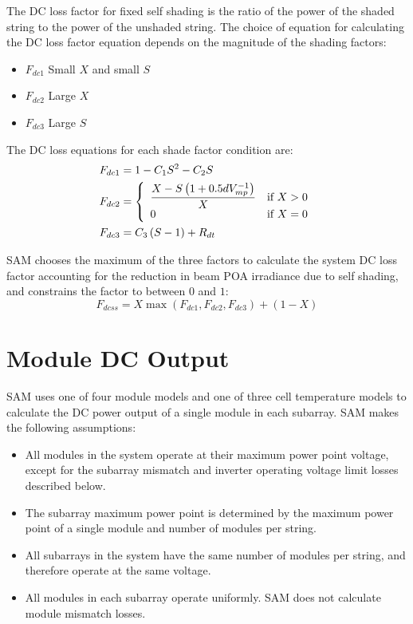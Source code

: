 \documentclass[12pt,letterpaper]{article}
\begin{document}
The DC loss factor for fixed self shading is the ratio of the power of the shaded string to the power of the unshaded string. The choice of equation for calculating the DC loss factor equation depends on the magnitude of the shading factors:
\begin{itemize}
\item $F_{dc1}$ \quad Small $X$ and small $S$
\item $F_{dc2}$ \quad Large $X$
\item $F_{dc3}$ \quad Large $S$
\end{itemize}

The DC loss equations for each shade factor condition are:
\begin{align}
F_{dc1} &= 1-C_1S^2-C_2S \notag\\ %
F_{dc2} &= 
\left\{
   \begin{array}{ll}
      \dfrac{X-S\left(1+0.5 d V^{-1}_{mp}\right)}{X} & \text{if $X>0$}\\
      0 & \text{if $X=0$}\\
   \end{array}
\right. \notag\\ %
F_{dc3} &= C_3\left(S-1\right)+R_{dt} %
\end{align}

SAM chooses the maximum of the three factors to calculate the system DC loss factor accounting for the reduction in beam POA irradiance due to self shading, and constrains the factor to between $0$ and $1$:
\begin{equation}\label{eqn-selfshadedcderate}
F_{dcss}=X\max\left(F_{dc1},F_{dc2},F_{dc3}\right)+(1-X)
\end{equation}

\chapter{Module DC Output}\label{sec-module}

SAM uses one of four module models and one of three cell temperature models to calculate the DC power output of a single module in each subarray. SAM makes the following assumptions:
\begin{itemize}
\item All modules in the system operate at their maximum power point voltage, except for the subarray mismatch and inverter operating voltage limit losses described below.
\item The subarray maximum power point is determined by the maximum power point of a single module and number of modules per string.
\item All subarrays in the system have the same number of modules per string, and therefore operate at the same voltage.
\item All modules in each subarray operate uniformly. SAM does not calculate module mismatch losses.
\end{itemize}
\end{document}
